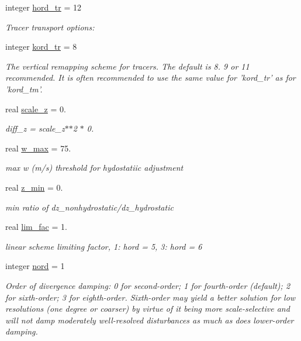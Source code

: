 \begin{DoxyCompactItemize}
integer \hyperlink{structfv__arrays__mod_1_1fv__flags__type_a6b189bf4be82ed34b367f1a7a6fa1106}{hord\-\_\-tr} = 12
\begin{DoxyCompactList}\small\item\em Tracer transport options\-: \end{DoxyCompactList}\item 
integer \hyperlink{structfv__arrays__mod_1_1fv__flags__type_afbfcb1b09e9aa21acdbcdaeccd8caf20}{kord\-\_\-tr} = 8
\begin{DoxyCompactList}\small\item\em The vertical remapping scheme for tracers. The default is 8. 9 or 11 recommended. It is often recommended to use the same value for 'kord\-\_\-tr' as for 'kord\-\_\-tm'. \end{DoxyCompactList}\item 
real \hyperlink{structfv__arrays__mod_1_1fv__flags__type_a3181a20aaac99c0817af03924d71b0fd}{scale\-\_\-z} = 0.
\begin{DoxyCompactList}\small\item\em diff\-\_\-z = scale\-\_\-z$\ast$$\ast$2 $\ast$ 0. \end{DoxyCompactList}\item 
real \hyperlink{structfv__arrays__mod_1_1fv__flags__type_a7966e3f1383bae981b26a75ce43ec46b}{w\-\_\-max} = 75.
\begin{DoxyCompactList}\small\item\em max w (m/s) threshold for hydostatiic adjustment \end{DoxyCompactList}\item 
real \hyperlink{structfv__arrays__mod_1_1fv__flags__type_acec362d2a6ae93bf42bbe7d2995ae7bd}{z\-\_\-min} = 0.
\begin{DoxyCompactList}\small\item\em min ratio of dz\-\_\-nonhydrostatic/dz\-\_\-hydrostatic \end{DoxyCompactList}\item 
real \hyperlink{structfv__arrays__mod_1_1fv__flags__type_aae1e7bd5b47feab9a53a8de279ae17e6}{lim\-\_\-fac} = 1.
\begin{DoxyCompactList}\small\item\em linear scheme limiting factor, 1\-: hord = 5, 3\-: hord = 6 \end{DoxyCompactList}\item 
integer \hyperlink{structfv__arrays__mod_1_1fv__flags__type_a2a8b948ce9b26a36723b037fb1db2cba}{nord} = 1
\begin{DoxyCompactList}\small\item\em Order of divergence damping\-: 0 for second-\/order; 1 for fourth-\/order (default); 2 for sixth-\/order; 3 for eighth-\/order. Sixth-\/order may yield a better solution for low resolutions (one degree or coarser) by virtue of it being more scale-\/selective and will not damp moderately well-\/resolved disturbances as much as does lower-\/order damping. \end{DoxyCompactList}\item 

\end{DoxyCompactItemize}
